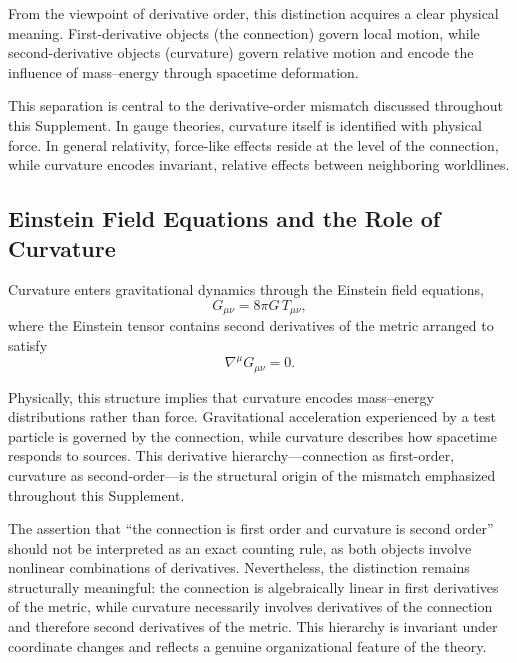 \documentclass[12pt,letterpaper]{article}
\begin{document}
From the viewpoint of derivative order, this distinction acquires a clear physical meaning.
First-derivative objects (the connection) govern local motion, while second-derivative objects (curvature) govern relative motion and encode the influence of mass--energy through spacetime deformation.

This separation is central to the derivative-order mismatch discussed throughout this Supplement. In gauge theories, curvature itself is identified with physical force.
In general relativity, force-like effects reside at the level of the connection, while curvature encodes invariant, relative effects between neighboring worldlines.

\subsection{Einstein Field Equations and the Role of Curvature}

Curvature enters gravitational dynamics through the Einstein field equations,
\begin{equation}
G_{\mu\nu} = 8\pi G\, T_{\mu\nu},
\end{equation}
where the Einstein tensor contains second derivatives of the metric arranged to satisfy
\begin{equation}
\nabla^\mu G_{\mu\nu} = 0.
\end{equation}

Physically, this structure implies that curvature encodes mass--energy distributions rather than force. Gravitational acceleration experienced by a test particle is governed by the connection, while curvature describes how spacetime responds to sources. This derivative hierarchy---connection as first-order, curvature as second-order---is the structural origin of the mismatch emphasized throughout this Supplement.

The assertion that ``the connection is first order and curvature is second order'' should not be interpreted as an exact counting rule, as both objects involve nonlinear combinations of derivatives. Nevertheless, the distinction remains structurally meaningful: the connection is algebraically linear in first derivatives of the metric, while curvature necessarily involves derivatives of the connection and therefore second derivatives of the metric. This hierarchy is invariant under coordinate changes and reflects a genuine organizational feature of the theory.
\end{document}
